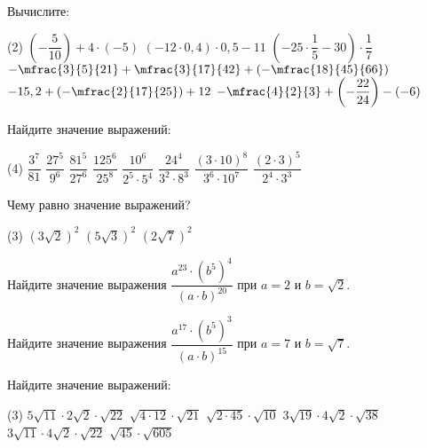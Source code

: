%
%

\begin{class}[number=1]
	\begin{listofex}
		\item Вычислите:
		\begin{tasks}(2)
			\task \( \left( -\dfrac{ 5 }{ 10 } \right)+4 \cdot (-5) \)
			\task \( (-12 \cdot 0,4) \cdot 0,5 - 11 \)
			\task \( (-25 \cdot \dfrac{ 1 }{ 5 } - 30) \cdot \dfrac{ 1 }{ 7 } \)
			\task \( -\mfrac{3}{5}{21}+\mfrac{3}{17}{42}+\left(-\mfrac{18}{45}{66}\right) \)
			\task \( -15,2 + \left(-\mfrac{2}{17}{25}\right) + 12 \)
			\task \( -\mfrac{4}{2}{3} + \left(-\dfrac{22}{24}\right) - (-6) \)
		\end{tasks}
		\item Найдите значение выражений:
		\begin{tasks}(4)
			\task \( \dfrac{3^7}{81} \)
			\task \( \dfrac{27^5}{9^6} \)
			\task \( \dfrac{81^5}{27^6} \)
			\task \( \dfrac{125^6}{25^8} \)
			\task \( \dfrac{10^6}{2^5\cdot5^4} \)
			\task \( \dfrac{24^4}{3^2\cdot8^3} \)
			\task \( \dfrac{(3\cdot10)^8}{3^6\cdot10^7} \)
			\task \( \dfrac{(2\cdot3)^5}{2^4\cdot3^3} \)
		\end{tasks}
		\item Чему равно значение выражений?
		\begin{tasks}(3)
			\task \( (3\sqrt{2})^2 \)
			\task \( (5\sqrt{3})^2 \)
			\task \( (2\sqrt{7})^2 \)
		\end{tasks}
		\item Найдите значение выражения \( \dfrac{a^{23}\cdot(b^5)^4}{(a\cdot b)^{20}} \) при \( a=2 \) и \( b=\sqrt{2} \).
		\item Найдите значение выражения \( \dfrac{a^{17}\cdot(b^5)^3}{(a\cdot b)^{15}} \) при \( a=7 \) и \( b=\sqrt{7} \).
		\item Найдите значение выражений:
		\begin{tasks}(3)
			\task \( 5\sqrt{11}\cdot2\sqrt{2}\cdot\sqrt{22} \)
			\task \( \sqrt{4\cdot12}\cdot\sqrt{21} \)
			\task \( \sqrt{2\cdot45}\cdot\sqrt{10} \)
			\task \( 3\sqrt{19}\cdot4\sqrt{2}\cdot\sqrt{38} \)
			\task \( 3\sqrt{11}\cdot4\sqrt{2}\cdot\sqrt{22} \)
			\task \( \sqrt{45}\cdot\sqrt{605} \)
		\end{tasks}
	\end{listofex}
\end{class}

